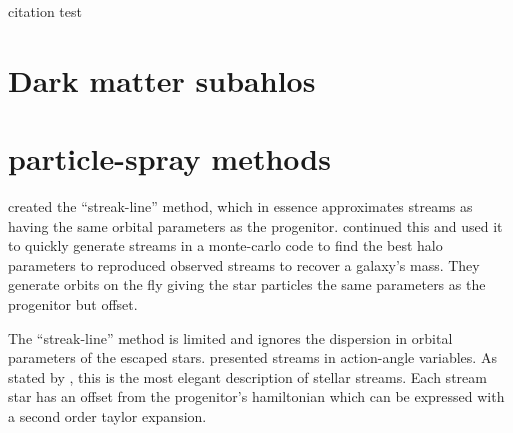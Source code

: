 \textcite{DIO_OBSPM} citation test



\section{Dark matter subahlos}

\section{particle-spray methods}

\citet{2012MNRAS.420.2700K} created the ``streak-line'' method, which in essence approximates streams as having the same orbital parameters as the progenitor. \citet{2014ApJ...795...94B} continued this and used it to quickly generate streams in a monte-carlo code to find the best halo parameters to reproduced observed streams to recover a galaxy's mass. They generate orbits on the fly giving the star particles the same parameters as the progenitor but offset. 

The ``streak-line'' method is limited and ignores the dispersion in orbital parameters of the escaped stars. \citet{2011MNRAS.413.1852E} presented streams in action-angle variables. As stated by \citet{2015MNRAS.452..301F}, this is the most elegant description of stellar streams. Each stream star has an offset from the progenitor's hamiltonian which can be expressed with a second order taylor expansion. 

